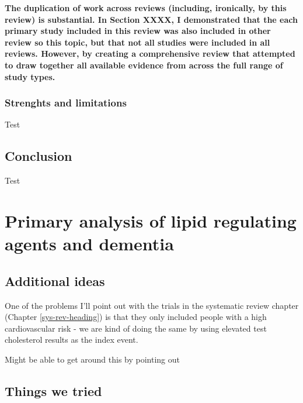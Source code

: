 \documentclass[a4paper, twoside]{templates/ociamthesis}
\begin{document}
\textbf{The duplication of work across reviews (including, ironically, by this review) is substantial. In Section XXXX, I demonstrated that the each primary study included in this review was also included in other review so this topic, but that not all studies were included in all reviews. However, by creating a comprehensive review that attempted to draw together all available evidence from across the full range of study types.}

\hypertarget{strenghts-and-limitations}{%
\subsection{Strenghts and limitations}\label{strenghts-and-limitations}}

Test

\hypertarget{conclusion}{%
\section{Conclusion}\label{conclusion}}

Test



\hypertarget{cprd-analysis-heading}{%
\chapter{Primary analysis of lipid regulating agents and dementia}\label{cprd-analysis-heading}}

\minitoc 

\hypertarget{additional-ideas-2}{%
\section{Additional ideas}\label{additional-ideas-2}}

One of the problems I'll point out with the trials in the systematic review chapter (Chapter \ref{sys-rev-heading}) is that they only included people with a high cardiovascular risk - we are kind of doing the same by using elevated test cholesterol results as the index event.

Might be able to get around this by pointing out

\hypertarget{things-we-tried}{%
\section{Things we tried}\label{things-we-tried}}
\end{document}
